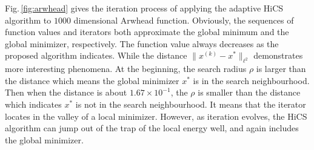 \documentclass[final,1p,times]{elsarticle}
\begin{document}
Fig.\,\ref{fig:arwhead} gives the iteration process of
applying the adaptive HiCS algorithm to $1000$ dimensional Arwhead function.
Obviously, the sequences of function values and iterators both
approximate the global minimum and the global minimizer, respectively. 
The function value always decreases as the proposed algorithm
indicates. While the distance $\|x^{(k)}-x^*\|_{\ell^2}$
demonstrates more interesting phenomena. At the beginning, the
search radius $\rho$ is larger than the distance which means the global
minimizer $x^*$ is in the search neighbourhood. Then when the distance is
about $1.67\times 10^{-1}$, the $\rho$ is smaller than the
distance which indicates $x^*$ is not in the search neighbourhood. 
It means that the iterator locates in the valley of a local minimizer. 
However, as iteration evolves, the HiCS algorithm can jump out of
the trap of the local energy well, and again  includes the global minimizer.



%
%
%
\end{document}
